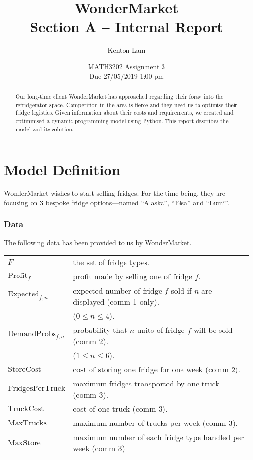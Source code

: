 \documentclass[11pt,a4paper]{article}
\author{Kenton Lam}
\date{{MATH3202 Assignment 3 \\ Due 27/05/2019 1:00 pm}}
\title{WonderMarket \\ Section A -- Internal Report}
\begin{document}
\maketitle
\begin{abstract}
    Our long-time client WonderMarket has approached regarding their foray into the 
    refridgerator space. Competition in the area is fierce and they need us 
    to optimise their fridge logistics.
    Given information about their costs and requirements, we created and
    optimmised a dynamic programming model using Python.
    This report describes the model and its solution.
\end{abstract}

\part{Model Definition}
WonderMarket wishes to start selling fridges. For the time being, they are focusing 
on 3 bespoke fridge options---named ``Alaska'', ``Elsa'' and ``Lumi''.

\section{Data}
The following data has been provided to us by WonderMarket. 

\begin{tabular}{l l}
    $F$ & the set of fridge types. \\
    $\mathrm{Profit}_{f}$ & profit made by selling one of fridge $f$. \\
    $\mathrm{Expected}_{f,n}$& expected number of fridge $f$ sold if $n$ are displayed (comm 1 only). \\
        & ($ 0 \le n \le 4$). \\ 
    $\mathrm{DemandProbs}_{f, n}$ & probability that $n$ units of fridge $f$ will be sold (comm 2).\\
        & ($ 1 \le n \le 6$). \\ 
    $\mathrm{StoreCost}$ & cost of storing one fridge for one week (comm 2). \\
    $\mathrm{FridgesPerTruck}$ & maximum fridges transported by one truck (comm 3). \\ 
    $\mathrm{TruckCost}$ & cost of one truck (comm 3). \\ 
    $\mathrm{MaxTrucks}$ & maximum number of trucks per week (comm 3). \\ 
    $\mathrm{MaxStore}$ & maximum number of each fridge type handled per week (comm 3). \\
\end{tabular}
\end{document}
